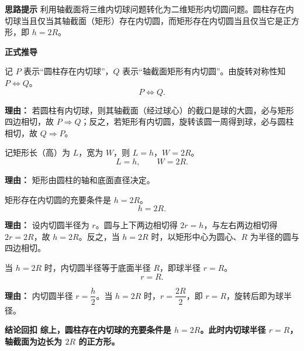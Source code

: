 \begin{proofbox}
	\textbf{\textcolor{CProof}{思路提示}}
	利用轴截面将三维内切球问题转化为二维矩形内切圆问题。圆柱存在内切球当且仅当其轴截面（矩形）存在内切圆，而矩形存在内切圆当且仅当它是正方形，即 $h=2R$。

	\medskip
	\textbf{\textcolor{CProof}{正式推导}}
	\begin{description}[style=nextline, leftmargin=2.8em, labelsep=0.5em, itemsep=0.55em]
		\item[\textbf{步骤一（转化截面）：}]
			记 $P$ 表示“圆柱存在内切球”，$Q$ 表示“轴截面矩形有内切圆”。由旋转对称性知 $P\iff Q$。
			\[
				P \iff Q.
			\]
			\par\textbf{理由：} 若圆柱有内切球，则其轴截面（经过球心）的截口是球的大圆，必与矩形四边相切，故 $P\Rightarrow Q$；反之，若矩形有内切圆，旋转该圆一周得到球，必与圆柱相切，故 $Q\Rightarrow P$。
		\item[\textbf{步骤二（矩形尺寸）：}]
			记矩形长（高）为 $L$，宽为 $W$，则 $L=h$，$W=2R$。
			\[
				L = h,
				\qquad
				W = 2R.
			\]
			\par\textbf{理由：} 矩形由圆柱的轴和底面直径决定。
		\item[\textbf{步骤三（内切圆条件）：}]
			矩形存在内切圆的充要条件是 $h=2R$。
			\[
				h = 2R.
			\]
			\par\textbf{理由：} 设内切圆半径为 $r$。圆与上下两边相切得 $2r = h$，与左右两边相切得 $2r = 2R$，故 $h=2R$。反之，当 $h=2R$ 时，以矩形中心为圆心、$R$ 为半径的圆与四边相切。
		\item[\textbf{步骤四（球半径确定）：}]
			当 $h=2R$ 时，内切圆半径等于底面半径 $R$，即球半径 $r=R$。
			\[
				r = R.
			\]
			\par\textbf{理由：} 内切圆半径 $r = \dfrac{h}{2}$。当 $h=2R$ 时，$r = \dfrac{2R}{2}$，即 $r = R$，旋转后即为球半径。
	\end{description}

	\medskip
	\textbf{\textcolor{CProof}{结论回扣}}
	\textbf{综上，圆柱存在内切球的充要条件是 $h=2R$。此时内切球半径 $r=R$，轴截面为边长为 $2R$ 的正方形。}
\end{proofbox}
